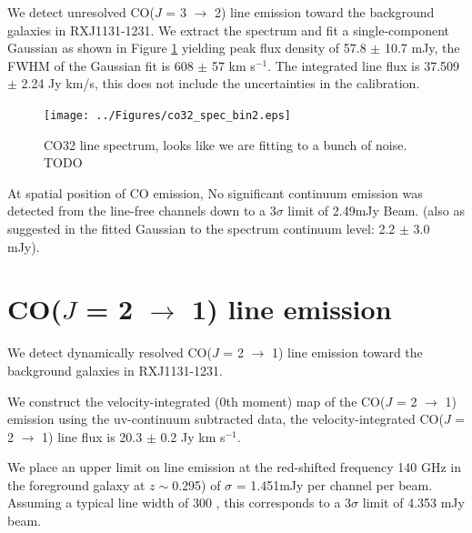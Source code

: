 \documentclass[]{emulateapj}
\begin{document}
We detect unresolved CO($J$ = 3 $\rightarrow$ 2) line emission toward the
background galaxies in RXJ1131-1231.
We extract the spectrum and fit a single-component Gaussian as shown in Figure
\ref{fig:co32spec}
yielding peak flux density of 57.8 $\pm$ 10.7 mJy, the FWHM of the Gaussian fit
is 608 $\pm$ 57 km s$^{-1}$. The integrated line flux is 37.509$\pm$ 2.24 Jy km/s, this does not include the uncertainties in 
the
calibration.

\begin{figure}[tbph]
\centering
\texttt{[image: ../Figures/co32\_spec\_bin2.eps]}
\caption{
CO32 line spectrum, looks like we are fitting to a bunch of noise. TODO
 \label{fig:co32spec}}
\end{figure}


At spatial position of CO emission, No significant continuum emission was
detected from the line-free channels down to a 3$\sigma$ limit of 2.49mJy Beam\pmOne.
(also as suggested in the fitted Gaussian to the spectrum continuum level: 2.2 $\pm$ 3.0 mJy).

\section{CO($J$ = 2 $\rightarrow$ 1) line emission}



We detect dynamically resolved CO($J$ = 2 $\rightarrow$ 1) line emission toward
the background galaxies in RXJ1131-1231.

We construct the velocity-integrated (0th moment) map of the CO($J$ = 2
$\rightarrow$ 1) emission using the uv-continuum subtracted data, the
velocity-integrated
CO($J$ = 2 $\rightarrow$ 1) line flux is 20.3 $\pm$ 0.2 Jy km s$^{-1}$.

We place an upper limit on  line emission at the red-shifted frequency 140 GHz in the foreground galaxy at $z
\sim
$0.295) of $\sigma$ = 1.451mJy per channel per beam. Assuming a typical line width of 300 \kms, this corresponds to a 3$
\sigma$
limit of 4.353 mJy \kms beam\pmOne.
\end{document}
